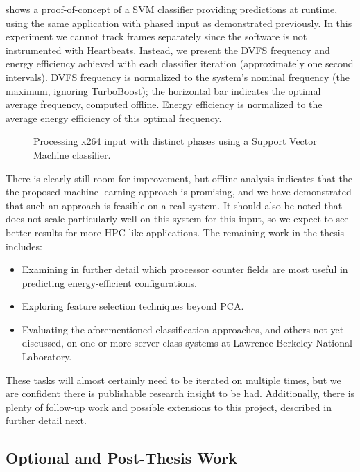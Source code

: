  shows a proof-of-concept of a SVM classifier providing predictions at runtime, using the same  application with phased input as demonstrated previously.
In this experiment we cannot track frames separately since the software is not instrumented with Heartbeats.
Instead, we present the DVFS frequency and energy efficiency achieved with each classifier iteration (approximately one second intervals).
DVFS frequency is normalized to the system's nominal frequency (the maximum, ignoring TurboBoost); the horizontal bar indicates the optimal average frequency, computed offline.
Energy efficiency is normalized to the average energy efficiency of this optimal frequency.

\begin{figure}[t]
  
  \caption{Processing x264 input with distinct phases using a Support Vector Machine classifier.}
  \label{fig:classifier-phases-x264}
\end{figure}

There is clearly still room for improvement, but offline analysis indicates that the the proposed machine learning approach is promising, and we have demonstrated that such an approach is feasible on a real system.
It should also be noted that  does not scale particularly well on this system for this input, so we expect to see better results for more HPC-like applications.
The remaining work in the thesis includes:
\begin{itemize}
\item Examining in further detail which processor counter fields are most useful in predicting energy-efficient configurations.
\item Exploring feature selection techniques beyond PCA.
\item Evaluating the aforementioned classification approaches, and others not yet discussed, on one or more server-class systems at Lawrence Berkeley National Laboratory.
\end{itemize}
These tasks will almost certainly need to be iterated on multiple times, but we are confident there is publishable research insight to be had.
Additionally, there is plenty of follow-up work and possible extensions to this project, described in further detail next.



\subsection{Optional and Post-Thesis Work}

